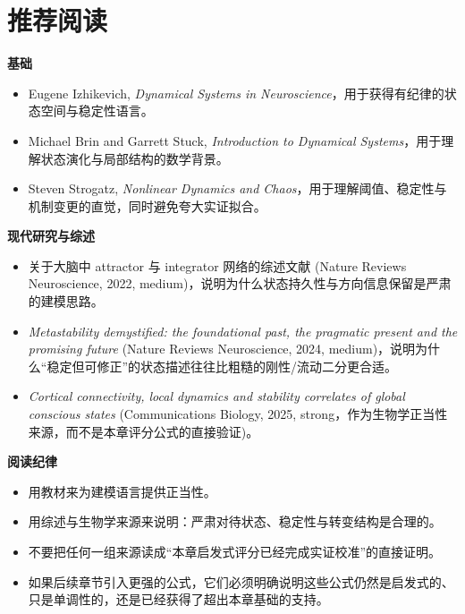 \section{推荐阅读}

\begin{readingbox}
\textbf{基础}
\begin{itemize}[nosep]
  \item Eugene Izhikevich, \emph{Dynamical Systems in Neuroscience}，用于获得有纪律的状态空间与稳定性语言。
  \item Michael Brin and Garrett Stuck, \emph{Introduction to Dynamical Systems}，用于理解状态演化与局部结构的数学背景。
  \item Steven Strogatz, \emph{Nonlinear Dynamics and Chaos}，用于理解阈值、稳定性与机制变更的直觉，同时避免夸大实证拟合。
\end{itemize}
\textbf{现代研究与综述}
\begin{itemize}[nosep]
  \item 关于大脑中 attractor 与 integrator 网络的综述文献 (Nature Reviews Neuroscience, 2022, medium)，说明为什么状态持久性与方向信息保留是严肃的建模思路。
  \item \emph{Metastability demystified: the foundational past, the pragmatic present and the promising future} (Nature Reviews Neuroscience, 2024, medium)，说明为什么“稳定但可修正”的状态描述往往比粗糙的刚性/流动二分更合适。
  \item \emph{Cortical connectivity, local dynamics and stability correlates of global conscious states} (Communications Biology, 2025, strong，作为生物学正当性来源，而不是本章评分公式的直接验证)。
\end{itemize}
\textbf{阅读纪律}
\begin{itemize}[nosep]
  \item 用教材来为建模语言提供正当性。
  \item 用综述与生物学来源来说明：严肃对待状态、稳定性与转变结构是合理的。
  \item 不要把任何一组来源读成“本章启发式评分已经完成实证校准”的直接证明。
  \item 如果后续章节引入更强的公式，它们必须明确说明这些公式仍然是启发式的、只是单调性的，还是已经获得了超出本章基础的支持。
\end{itemize}
\end{readingbox}